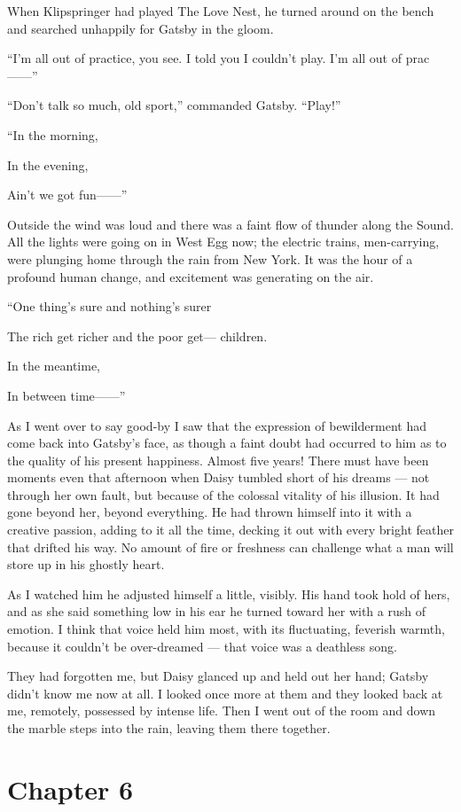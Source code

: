 \documentclass{znotebook}
\begin{document}
When Klipspringer had played The Love Nest, he turned around on the bench and searched unhappily for Gatsby in the gloom.

``I'm all out of practice, you see. I told you I couldn't play. I'm all out of prac ——''

``Don't talk so much, old sport,'' commanded Gatsby. ``Play!''

``In the morning,

In the evening,

Ain't we got fun——''

Outside the wind was loud and there was a faint flow of thunder along the Sound. All the lights were going on in West Egg now; the electric trains, men-carrying, were plunging home through the rain from New York. It was the hour of a profound human change, and excitement was generating on the air.

``One thing's sure and nothing's surer

The rich get richer and the poor get— children.

In the meantime,

In between time——''

As I went over to say good-by I saw that the expression of bewilderment had come back into Gatsby's face, as though a faint doubt had occurred to him as to the quality of his present happiness. Almost five years! There must have been moments even that afternoon when Daisy tumbled short of his dreams — not through her own fault, but because of the colossal vitality of his illusion. It had gone beyond her, beyond everything. He had thrown himself into it with a creative passion, adding to it all the time, decking it out with every bright feather that drifted his way. No amount of fire or freshness can challenge what a man will store up in his ghostly heart.

As I watched him he adjusted himself a little, visibly. His hand took hold of hers, and as she said something low in his ear he turned toward her with a rush of emotion. I think that voice held him most, with its fluctuating, feverish warmth, because it couldn't be over-dreamed — that voice was a deathless song.

They had forgotten me, but Daisy glanced up and held out her hand; Gatsby didn't know me now at all. I looked once more at them and they looked back at me, remotely, possessed by intense life. Then I went out of the room and down the marble steps into the rain, leaving them there together.

\chapter{Chapter 6}
\end{document}
